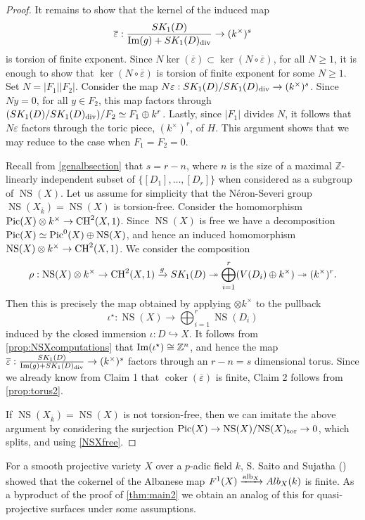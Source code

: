 \documentclass[12pt]{amsart}
\theoremstyle{remark}
\newcommand{\Z}{{\mathbb Z}}
\renewcommand{\1}{{\mathbb{S}}}
\newcommand{\alb}{{\rm alb}}
\newcommand{\CH}{{\rm CH}}
\newcommand{\Pic}{{\rm Pic}}
\newcommand{\NS}{{\operatorname{NS}}}
\newcommand{\<}{\langle}
\renewcommand{\>}{\rangle}
\newcommand{\cok}{{\operatorname{coker}}}
\newcommand{\tor}{{\rm tor}}
\newcommand{\img}{{\rm Im}}
\newcommand{\dv}{{\rm div}}
\begin{document}
\begin{proof}
It remains to show that the kernel of the induced map 
\[\overline{\varepsilon}:\frac{SK_{1}(D)}{\img(g) + SK_1(D)_{\dv}}\to (k^\times)^s\] is torsion of finite exponent. Since $N\ker(\overline{\varepsilon})\subset\ker(N\circ\overline{\varepsilon})$, for all $N\geq 1$, it is enough to show that $\ker(N\circ\overline{\varepsilon})$ is torsion of finite exponent for some $N\geq 1$. Set $N=|F_1||F_2|$. Consider the map $N\varepsilon: SK_1(D)/SK_1(D)_{\dv}\to (k^\times)^s$. Since $Ny=0$, for all $y\in F_2$, this map factors through $(SK_1(D)/SK_1(D)_{\dv})/F_2\simeq F_1\oplus k^r$. Lastly, since $|F_1|$ divides $N$, it follows that $N\varepsilon$ factors through the toric piece, $(k^\times)^r$, of $H$. This argument shows that we may reduce to the case when $F_1=F_2=0$. 



Recall from \autoref{genalbsection} that  $s=r-n$, where $n$ is the size of a maximal $\Z$-linearly independent subset of $\{[D_1],\ldots, [D_r]\}$ when considered as a subgroup of $\NS(X)$.  
Let us assume for simplicity that the N\'{e}ron-Severi group  $\NS(X_{\overline{k}})=\NS(X)$ is torsion-free. Consider the homomorphism $\Pic(X)\otimes k^\times\to\CH^2(X,1)$. Since $\NS(X)$ is free we have a decomposition 
$\Pic(X)\simeq\Pic^0(X)\oplus\NS(X)$, and hence an induced homomorphism $\NS(X)\otimes k^\times\to\CH^2(X,1)$. We consider the composition
\[\rho:\NS(X)\otimes k^\times\to\CH^2(X,1)\xrightarrow{g} SK_1(D)\twoheadrightarrow \bigoplus_{i=1}^r(V(D_i)\oplus k^\times)\twoheadrightarrow (k^\times)^r.\] 
Then this is precisely the map obtained by applying $\otimes k^\times$ to the pullback 
\[\iota^\star:\NS(X)\to\bigoplus_{i=1}^r\NS(D_i)\] induced by the closed immersion $\iota:D\hookrightarrow X$. It follows from \autoref{prop:NSXcomputations} that $\img(\iota^\star)\cong\Z^n$, and hence the map 
$\overline{\varepsilon}: \frac{SK_{1}(D)}{\img(g) + SK_1(D)_{\dv}}\to (k^\times)^s$ factors through an $r-n=s$ dimensional torus. 
Since we already know from Claim 1 that $\cok(\overline{\varepsilon})$ is finite, Claim 2 follows from \autoref{prop:torus2}. 

If $\NS(X_{\overline{k}})=\NS(X)$ is not torsion-free, then we can imitate the above argument by considering the surjection $\Pic(X)\to \NS(X)/\NS(X)_{\tor}\to 0$, which splits, and using \autoref{NSXfree}.



 
 \end{proof}
   For a smooth projective variety $X$ over a $p$-adic field $k$, S. Saito and Sujatha (\cite[p.~409]{SSu}) showed that the cokernel of the Albanese map $F^1(X)\xrightarrow{\alb_X}Alb_X(k)$ is finite. As a byproduct of the proof of \autoref{thm:main2} we obtain an analog of this for quasi-projective surfaces under some assumptions. 
\end{document}
